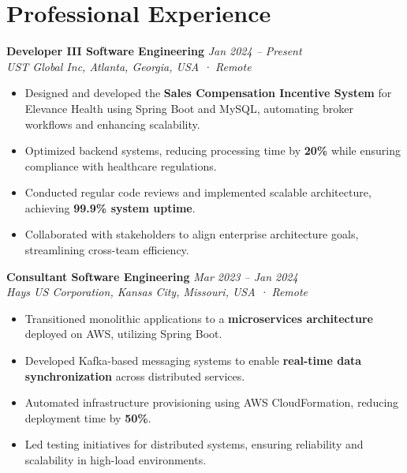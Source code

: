 \documentclass[a4paper,10pt]{article}
\begin{document}
\section*{Professional Experience}

\noindent\textbf{Developer III \textemdash{} Software Engineering} \hfill \textit{Jan 2024 -- Present} \\
\textit{UST Global Inc, Atlanta, Georgia, USA · Remote} \\
\vspace{-0.4cm}
\begin{itemize}[leftmargin=0.5cm, labelsep=0.3cm, itemsep=0.2em, parsep=0pt, topsep=0pt]
    \item Designed and developed the \textbf{Sales Compensation Incentive System} for Elevance Health using Spring Boot and MySQL, automating broker workflows and enhancing scalability.
    \item Optimized backend systems, reducing processing time by \textbf{20\%} while ensuring compliance with healthcare regulations.
    \item Conducted regular code reviews and implemented scalable architecture, achieving \textbf{99.9\% system uptime}.
    \item Collaborated with stakeholders to align enterprise architecture goals, streamlining cross-team efficiency.
\end{itemize}

\vspace{0.2cm}

\noindent\textbf{Consultant \textemdash{} Software Engineering} \hfill \textit{Mar 2023 -- Jan 2024} \\
\textit{Hays US Corporation, Kansas City, Missouri, USA · Remote} \\
\vspace{-0.4cm}
\begin{itemize}[leftmargin=0.5cm, labelsep=0.3cm, itemsep=0.2em, parsep=0pt, topsep=0pt]
    \item Transitioned monolithic applications to a \textbf{microservices architecture} deployed on AWS, utilizing Spring Boot.
    \item Developed Kafka-based messaging systems to enable \textbf{real-time data synchronization} across distributed services.
    \item Automated infrastructure provisioning using AWS CloudFormation, reducing deployment time by \textbf{50\%}.
    \item Led testing initiatives for distributed systems, ensuring reliability and scalability in high-load environments.
\end{itemize}
\end{document}
